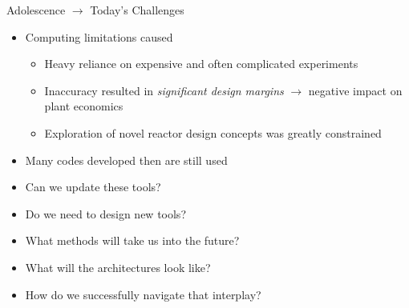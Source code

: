 \documentclass[xcolor=x11names,compress, handout]{beamer}
\renewcommand{\(}{\begin{columns}}
\renewcommand{\)}{\end{columns}}
\newcommand{\<}[1]{\begin{column}{#1}}
\renewcommand{\>}{\end{column}}
\begin{document}
\begin{frame}{Adolescence $\rightarrow$ Today's Challenges}
\begin{itemize}
\item Computing limitations caused
\begin{itemize}
\item Heavy reliance on expensive and often complicated experiments
\item Inaccuracy resulted in \emph{significant design margins} $\rightarrow$ negative impact on plant economics
\item Exploration of novel reactor design concepts was greatly constrained 
\vspace*{1 em}
\end{itemize}
\item Many codes developed then are still used 
\pause
\item Can we update these tools?
\pause
\item Do we need to design new tools?
\pause
\item What methods will take us into the future?
\pause
\item What will the architectures look like?
\pause
\item How do we successfully navigate that interplay?
\end{itemize}
\end{frame}
\end{document}
